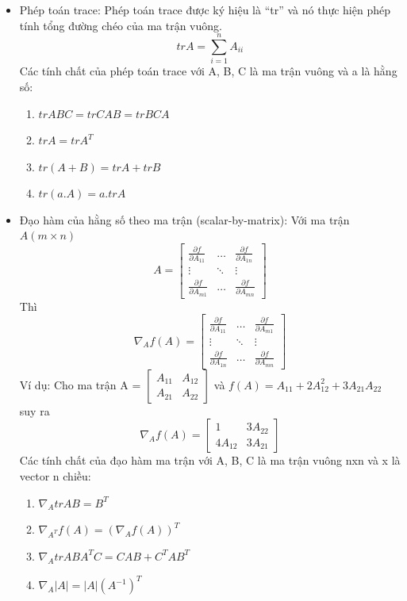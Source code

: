 \begin{itemize}
  \item Phép toán trace: Phép toán trace được ký hiệu là “tr” và nó thực hiện
  phép tính tổng đường chéo của ma trận vuông.
  \[ trA = \sum_{i=1}^{n} A_{ii} \]
  Các tính chất của phép toán trace với A, B, C là ma trận vuông và a là
  hằng số:
  \begin{enumerate}
    \item $trABC = trCAB = trBCA$
    \item $trA = trA^T$
    \item $tr(A+B) = trA + trB$
    \item $tr(a.A) = a.trA$
  \end{enumerate}
  \item Đạo hàm của hằng số theo ma trận (scalar-by-matrix):
  Với ma trận $A (m \times n)$
  \[  A =
  \begin{bmatrix}
  \frac{\partial f}{\partial A_{11}} & \dots & \frac{\partial f}{\partial
  A_{1n}}\\
  \vdots & \ddots & \vdots \\
  \frac{\partial f}{\partial A_{m1}} & \dots & \frac{\partial f}{\partial
  A_{mn}}  
   \end{bmatrix} \]
   Thì 
   \[ \nabla_A f(A) = 
   \begin{bmatrix}
  \frac{\partial f}{\partial A_{11}} & \dots & \frac{\partial f}{\partial
  A_{m1}}\\
  \vdots & \ddots & \vdots \\
  \frac{\partial f}{\partial A_{1n}} & \dots & \frac{\partial f}{\partial
  A_{mn}}  
   \end{bmatrix}  \]
  Ví dụ: Cho ma trận A = $ \begin{bmatrix} A_{11} & A_{12} \\ A_{21} & A_{22}
  \end{bmatrix} $ và $f(A) = A_{11} + 2A_{12}^{2} + 3A_{21}A_{22}$ suy ra
  \[ \nabla_A f(A) = \begin{bmatrix} 1 & 3A_{22} \\ 4A_{12} & 3A_{21}
  \end{bmatrix} \]
  Các tính chất của đạo hàm ma trận với A, B, C là ma trận vuông nxn và x là
  vector n chiều:
  \begin{enumerate}
    \item $\nabla_A trAB = B^T$
    \item $\nabla_{A^T} f(A) = (\nabla_A f(A))^T$
    \item $\nabla_A trABA^TC = CAB + C^TAB^T$
    \item $\nabla_A |A|=|A|(A^{-1})^T$

\end{enumerate}
\end{itemize}
